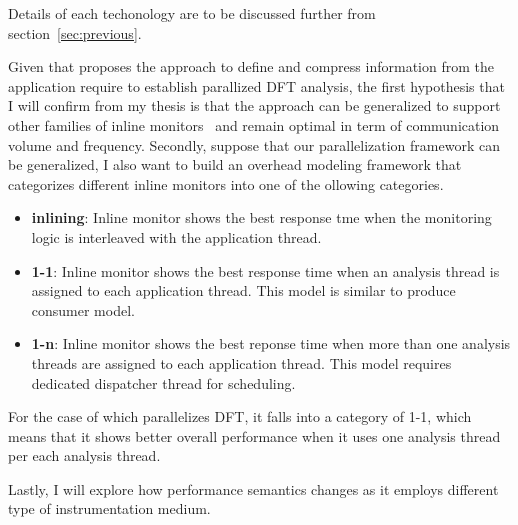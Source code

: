 Details of each techonology are to be discussed further from
section~\ref{sec:previous}.

%
%
Given that \sreplica proposes the approach to define and compress information
from the application require to establish parallized DFT analysis, the first
hypothesis that I will confirm from my thesis is that the approach can be
generalized to support other families of inline monitors~\cite{} and remain
optimal in term of communication volume and frequency.
%
Secondly, suppose that our parallelization framework can be generalized, I also
want to build an overhead modeling framework that categorizes different inline
monitors into one of the ollowing categories.

\begin{itemize}

        \item {\bf inlining}: Inline monitor shows the best response tme when
                the monitoring logic is interleaved with the application
                thread.

        \item {\bf 1-1}: Inline monitor shows the best response time when an
                analysis thread is assigned to each application thread. This
                model is similar to produce consumer model.

        \item {\bf 1-n}: Inline monitor shows the best reponse time when more
                than one analysis threads are assigned to each application
                thread. This model requires dedicated dispatcher thread for
                scheduling.
\end{itemize}

For the case of \sreplica which parallelizes DFT, it falls into a category of
1-1, which means that it shows better overall performance when it uses one
analysis thread per each analysis thread. 

Lastly, I will explore how performance semantics changes as it employs
different type of instrumentation medium.

